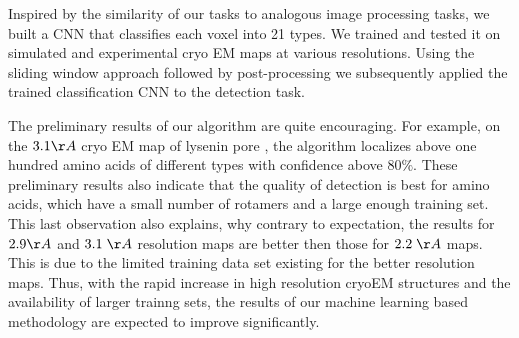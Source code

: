 Inspired by the similarity of our tasks to analogous image processing tasks, we built a CNN that classifies each voxel into 21 types. 
We  trained and tested it on simulated and experimental cryo EM maps at various resolutions.
Using the sliding window approach followed by  post-processing we subsequently applied  the trained  classification CNN to the detection task.  

The preliminary results of our algorithm are quite encouraging.
For example, on the $3.1 \AA$ cryo EM map of lysenin pore \cite{Bokori-Brown2016Cryo-EMProtein}, the algorithm localizes above one hundred amino acids of different types with confidence above $80 \%$.
These preliminary results also indicate that the quality of detection is best for amino acids, which have a small number of rotamers and a large enough training set.  This last observation also explains, why
contrary to expectation, the results for  $2.9  \AA$ and $3.1 \;\AA$ resolution maps are better then those for $2.2 \;\AA$ maps. This is due to the limited training data set existing for the better resolution maps.  Thus, with the rapid increase in high resolution cryoEM structures and the availability of larger trainng sets, the results of our machine learning based methodology are expected to improve significantly.











